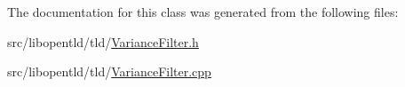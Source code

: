 The documentation for this class was generated from the following files:\begin{DoxyCompactItemize}
\item 
src/libopentld/tld/\hyperlink{_variance_filter_8h}{VarianceFilter.h}\item 
src/libopentld/tld/\hyperlink{_variance_filter_8cpp}{VarianceFilter.cpp}\end{DoxyCompactItemize}
